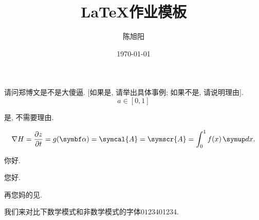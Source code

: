 \documentclass[chinese]{assignment}[2021/03/08]
\title{\LaTeX 作业模板}
\author{陈旭阳}
\date{\today}
\institute{同济大学数学科学学院}
\begin{document}
    \maketitle

    \begin{problem}
        请问郑博文是不是大傻逼. [如果是, 请举出具体事例; 如果不是, 请说明理由].
        \begin{equation}
            a\in[0, 1]
        \end{equation}
    \end{problem}

    \begin{solution}
        是, 不需要理由.

        \begin{equation}
            \nabla{H}=\frac{\partial{z}}{\partial{t}}=g(\vect{\alpha}) = \symcal{A} = \symscr{A} = \int_{0}^{1}f(x)\diff x.
        \end{equation}

        你好.


    \end{solution}

    \clearpage

    您好.

    \begin{problem}
        再您妈的见.
    \end{problem}

    我们来对比下数学模式和非数学模式的字体$01234$01234.
\end{document}
